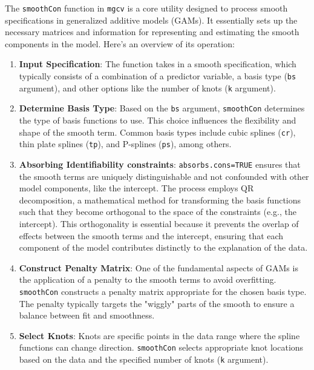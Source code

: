 \documentclass[12pt, twoside,hidelinks]{article}
\theoremstyle{definition}
\numberwithin{equation}{section}
\begin{document}
The \texttt{smoothCon} function in \texttt{mgcv} is a core utility designed to process smooth specifications in generalized additive models (GAMs). It essentially sets up the necessary matrices and information for representing and estimating the smooth components in the model. Here's an overview of its operation:

\begin{enumerate}[label=\arabic*., left=0pt]
    \item \textbf{Input Specification}: The function takes in a smooth specification, which typically consists of a combination of a predictor variable, a basis type (\texttt{bs} argument), and other options like the number of knots (\texttt{k} argument).
    
    \item \textbf{Determine Basis Type}: Based on the \texttt{bs} argument, \texttt{smoothCon} determines the type of basis functions to use. This choice influences the flexibility and shape of the smooth term. Common basis types include cubic splines (\texttt{cr}), thin plate splines (\texttt{tp}), and P-splines (\texttt{ps}), among others.

    \item \textbf{Absorbing Identifiability constraints}: \texttt{absorbs.cons=TRUE} ensures that the smooth terms are uniquely distinguishable and not confounded with other model components, like the intercept. The process employs QR decomposition, a mathematical method for transforming the basis functions such that they become orthogonal to the space of the constraints (e.g., the intercept). This orthogonality is essential because it prevents the overlap of effects between the smooth terms and the intercept, ensuring that each component of the model contributes distinctly to the explanation of the data. 

    
    \item \textbf{Construct Penalty Matrix}: One of the fundamental aspects of GAMs is the application of a penalty to the smooth terms to avoid overfitting. \texttt{smoothCon} constructs a penalty matrix appropriate for the chosen basis type. The penalty typically targets the "wiggly" parts of the smooth to ensure a balance between fit and smoothness.
    
    \item \textbf{Select Knots}: Knots are specific points in the data range where the spline functions can change direction. \texttt{smoothCon} selects appropriate knot locations based on the data and the specified number of knots (\texttt{k} argument).
    

\end{enumerate}
\end{document}
